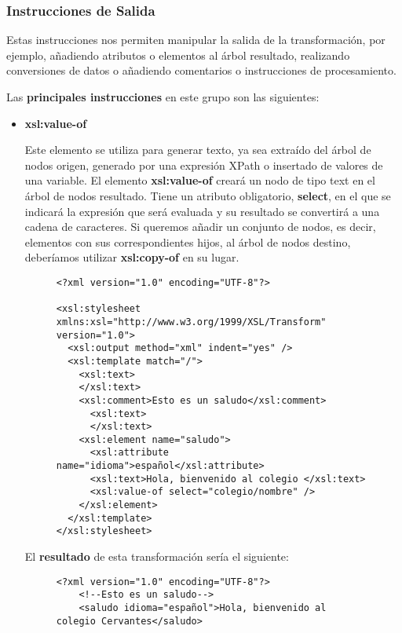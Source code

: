 \subsubsection{Instrucciones de Salida}
Estas instrucciones nos permiten manipular la salida de la transformación, por ejemplo, añadiendo atributos o elementos al árbol resultado, realizando conversiones de datos o añadiendo comentarios o instrucciones de procesamiento.

Las \textbf{principales instrucciones} en este grupo son las siguientes:

\begin{itemize}
    \item \textbf{xsl:value-of}

    Este elemento se utiliza para generar texto, ya sea extraído del árbol de nodos origen, generado por una expresión XPath o insertado de valores de una variable. El elemento \textbf{xsl:value-of} creará un nodo de tipo text en el árbol de nodos resultado. Tiene un atributo obligatorio, \textbf{select}, en el que se indicará la expresión que será evaluada y su resultado se convertirá a una cadena de caracteres. Si queremos añadir un conjunto de nodos, es decir, elementos con sus correspondientes hijos, al árbol de nodos destino, deberíamos utilizar \textbf{xsl:copy-of} en su lugar.

    \begin{figure}[H]
        \begin{tcolorbox}[sharp corners, colback=yellow!30, colframe=white!20]
            \scriptsize
\begin{verbatim}
<?xml version="1.0" encoding="UTF-8"?>

<xsl:stylesheet xmlns:xsl="http://www.w3.org/1999/XSL/Transform" version="1.0">
  <xsl:output method="xml" indent="yes" />
  <xsl:template match="/">
    <xsl:text>
    </xsl:text>
    <xsl:comment>Esto es un saludo</xsl:comment>
      <xsl:text>
      </xsl:text>
    <xsl:element name="saludo">
      <xsl:attribute name="idioma">español</xsl:attribute>
      <xsl:text>Hola, bienvenido al colegio </xsl:text>
      <xsl:value-of select="colegio/nombre" />
    </xsl:element>
  </xsl:template>
</xsl:stylesheet>
\end{verbatim}
        \end{tcolorbox}
    \end{figure}

    El \textbf{resultado} de esta transformación sería el siguiente:

    \begin{figure}[H]
        \begin{tcolorbox}[sharp corners, colback=yellow!30, colframe=white!20]
            \scriptsize
\begin{verbatim}
<?xml version="1.0" encoding="UTF-8"?>
    <!--Esto es un saludo-->
    <saludo idioma="español">Hola, bienvenido al colegio Cervantes</saludo>
\end{verbatim}
        \end{tcolorbox}
    \end{figure}


\end{itemize}
